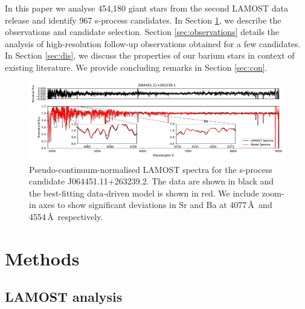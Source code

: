 \documentclass[a4paper,fleqn,usenatbib]{mnras}
\begin{document}
In this paper we analyse 454,180 giant stars from the second LAMOST data release \citep{luo2015} and identify 967 s-process candidates. In Section \ref{sec:methods}, we describe the observations and candidate selection. Section \ref{sec:observations} details the analysis of high-resolution follow-up observations obtained for a few candidates. In Section \ref{sec:dis}, we discuss the properties of our barium stars in context of existing literature. We provide concluding remarks in Section \ref{sec:con}.

\begin{figure}
	\includegraphics[width=\textwidth]{posterchild_final.pdf}
    \caption{Pseudo-continuum-normalised LAMOST spectra for the s-process candidate J064451.11+263239.2. The data are shown in black and the best-fitting data-driven model is shown in red. We include zoom-in axes to show significant deviations in Sr and Ba at  4077\,\AA\ and 4554\,\AA\, respectively.}
    \label{fig:figure1}
\end{figure}



\section{Methods} \label{sec:methods}
\subsection{LAMOST analysis}
\end{document}
